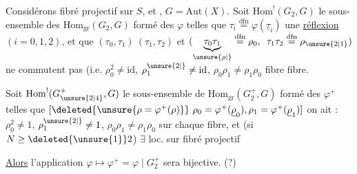 Considérons fibré projectif  sur $S$,  et , $G=\mathrm{Aut}(X)$.  Soit $\mathrm{Hom}^!(G_2,G)$ le sous-ensemble des $\mathrm{Hom}_{\mathrm{gr}}(G_2,G)$ formé des $\varphi$ telles que $\tau_i\overset{\mathrm{dfn}}{=}\varphi(\underline{\tau}_i)$  une \uline{réflexion} $(i=0,1,2)$, et que $(\tau_0,\tau_1)\ (\tau_1,\tau_2)$ et $(\underbrace{\tau_0\tau_1}_{\unsure{\rho|{}}}\overset{\mathrm{dfn}}{=}\rho_0,\enspace \tau_1\tau_2\overset{\mathrm{dfn}}{=}\rho_{\unsure{2|1}})$ ne commutent pas  (i.e. $\rho_0^2\ne\mathrm{id}$, $\rho_1^{\unsure{2|{}}}\ne\mathrm{id}$, $\rho_0\rho_1\ne\rho_1\rho_0$ fibre  fibre.


Soit $\mathrm{Hom}^!(G_{\unsure{2|4}}^+,G)$ le sous-ensemble de $\mathrm{Hom}_{\mathrm{gr}}(G_2^+,G)$ formé des $\varphi^+$ telles que $[\deleted{\unsure{\rho=\varphi^+(\rho)}}\ \rho_0=\varphi^+(\underline{\rho}_0),\rho_1=\varphi^+(\underline{\rho}_1)]$ on ait : $\rho_0^2\ne1$, $\rho_1^{\unsure{2|{}}}\ne1$, $\rho_0\rho_1\ne\rho_1\rho_0$ sur chaque fibre, et (si $N\geq\deleted{\unsure{1}}2$) $\exists$ loc. sur  fibré projectif  

\uline{Alors} l'application $\varphi\longmapsto\varphi^+=\varphi\mid G_2^+$ sera bijective. (?)

